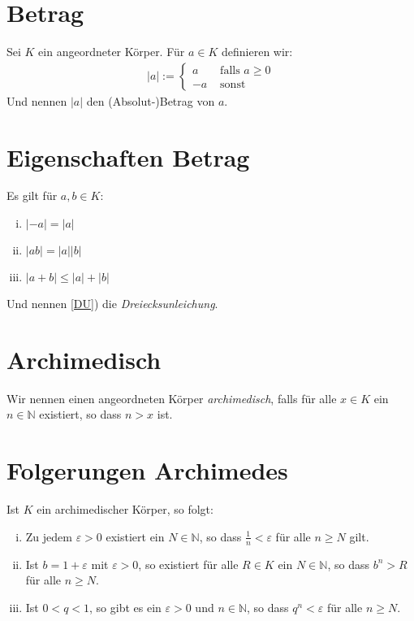 \documentclass{scrreprt}
\newcommand{\NN}{\mathbb{N}}
\begin{document}
    \section{Betrag}
    Sei $K$ ein angeordneter Körper. Für $a \in K$ definieren wir:
    \begin{align*}
        |a| :=
        \begin{cases}
            a &\text{ falls } a \geq 0\\
            -a &\text{ sonst }
        \end{cases}
    \end{align*}
    Und nennen $|a|$ den (Absolut-)Betrag von $a$.

    \section{Eigenschaften Betrag}
    Es gilt für $a, b \in K$:
    \begin{enumerate}[i)]
        \item
            $|-a| = |a|$
        \item
            $|ab| = |a| |b|$
        \item\label{DU}
            $|a  + b| \leq |a| + |b|$ 
    \end{enumerate}
    Und nennen \ref{DU}) die \emph{Dreiecksunleichung}.

    \section{Archimedisch}
    Wir nennen einen angeordneten Körper \emph{archimedisch}, falls für alle $x \in K$ ein $n \in \NN$ existiert, so dass $n > x$ ist.

    \section{Folgerungen Archimedes}
    Ist $K$ ein archimedischer Körper, so folgt:
    \begin{enumerate}[i)]
        \item
            Zu jedem $\varepsilon > 0$ existiert ein $N \in \NN$, so dass $\frac{1}{n} < \varepsilon$ für alle $n \geq N$ gilt.
        \item
            Ist $b = 1 + \varepsilon$ mit $\varepsilon > 0$, so existiert für alle $ R \in K$ ein $N \in \NN$, so dass $b^n > R$ für alle $n \geq N$.
        \item
            Ist $0 < q < 1$, so gibt es ein $\varepsilon > 0$ und $n \in \NN$, so dass $q^n < \varepsilon$ für alle $n \geq N$.
    \end{enumerate}
\end{document}
